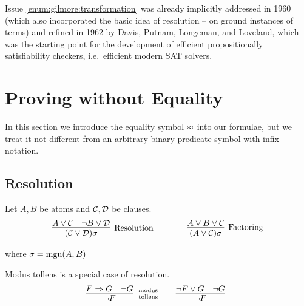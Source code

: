 Issue \ref{enum:gilmore:transformation} was already implicitly 
addressed in 1960 \cite{Davis:1960:CPQ:321033.321034}
(which also incorporated the basic idea of resolution -- on ground instances of terms)
and refined in 1962 \cite{Davis:1962:MPT:368273.368557}
by Davis, Putnam, Longeman, and Loveland, 
which was the starting point for the development of efficient propositionally satisfiability checkers, i.e.~efficient modern SAT solvers.


\section{Proving without Equality}\label{sec:proving:without:equaltiy}

In this section we introduce the equality symbol $\approx$ into our formulae, 
but we treat it not different from an arbitrary binary predicate symbol with infix notation. 

\subsection{Resolution}\label{sec:resolution}

\begin{definition}\label{def:resolution} Let $A, B$ be atoms and ${\mathcal C},{\mathcal D}$ be clauses.
	\begin{gather*}
	\infer
	[\text{Resolution}] 
	{(\mcC\lor\mcD)\sigma}
	{A\lor\mcC&\lnot B\lor\mcD}
	\qquad\qquad
	\infer
	[\text{Factoring}] 
	{(A\lor\mcC)\sigma}
	{A\lor B\lor\mcC}
	\end{gather*}
	\begin{center}
		where
		$\sigma=\operatorname{mgu}(A,B)$
	\end{center}
\end{definition}

\begin{example}Modus tollens is a special case of resolution.
	\begin{gather*}
	\infer[\text{modus}\atop\text{tollens}]{\lnot F}{F\limp G & \lnot G}
	\qquad
	\infer[]{\lnot F}{\lnot F\lor G & \lnot G}
	\end{gather*}
\end{example}


